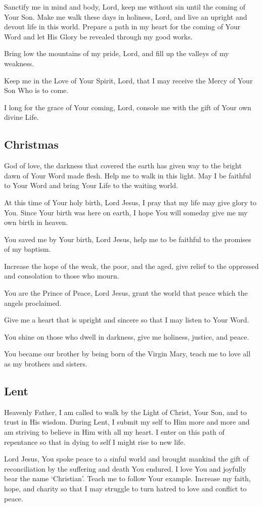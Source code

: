 \documentclass[12pt]{article}
\newcommand{\prayertitle}[1]{\subsection{#1}}
\begin{document}
Sanctify me in mind and body, Lord, keep me without sin until the coming of Your Son.
Make me walk these days in holiness, Lord, and live an upright and devout life in this world.
Prepare a path in my heart for the coming of Your Word and let His Glory be revealed through my good works.

Bring low the mountains of my pride, Lord, and fill up the valleys of my weakness.

Keep me in the Love of Your Spirit, Lord, that I may receive the Mercy of Your Son Who is to come.

I long for the grace of Your coming, Lord, console me with the gift of Your own divine Life.

\prayertitle{Christmas}
God of love, the darkness that covered the earth has given way to the bright dawn of Your Word made flesh.
Help me to walk in this light.
May I be faithful to Your Word and bring Your Life to the waiting world.

At this time of Your holy birth, Lord Jesus, I pray that my life may give glory to You.
Since Your birth was here on earth, I hope You will someday give me my own birth in heaven.

You saved me by Your birth, Lord Jesus, help me to be faithful to the promises of my baptism.

Increase the hope of the weak, the poor, and the aged, give relief to the oppressed and consolation to those who mourn.

You are the Prince of Peace, Lord Jesus, grant the world that peace which the angels proclaimed.

Give me a heart that is upright and sincere so that I may listen to Your Word.

You shine on those who dwell in darkness, give me holiness, justice, and peace.

You became our brother by being born of the Virgin Mary, teach me to love all as my brothers and sisters.

\prayertitle{Lent}
Heavenly Father, I am called to walk by the Light of Christ, Your Son, and to trust in His wisdom.
During Lent, I submit my self to Him more and more and am striving to believe in Him with all my heart.
I enter on this path of repentance so that in dying to self I might rise to new life.

Lord Jesus, You spoke peace to a sinful world and brought mankind the gift of reconciliation by the suffering and death You endured.
I love You and joyfully bear the name `Christian'.
Teach me to follow Your example.
Increase my faith, hope, and charity so that I may struggle to turn hatred to love and conflict to peace.
\end{document}
